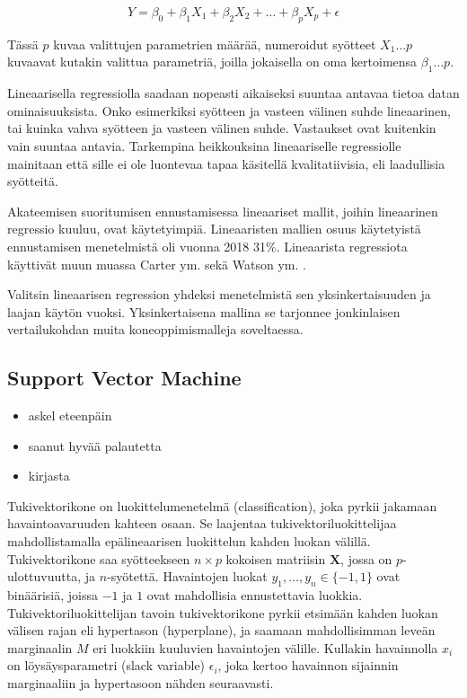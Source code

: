 \documentclass[finnish,twoside,openright]{HYgraduMLDS}
\begin{document}
\begin{equation} \label{eq:2}
    Y = \beta_0 + \beta_1 X_1 + \beta_2 X_2 + \dots + \beta_p X_p + \epsilon
\end{equation}

Tässä $p$ kuvaa valittujen parametrien määrää, numeroidut syötteet $X_1\dots p$ kuvaavat kutakin valittua parametriä, joilla jokaisella on oma kertoimensa $\beta_1\dots p$.

Lineaarisella regressiolla saadaan nopeasti aikaiseksi suuntaa antavaa tietoa datan ominaisuuksista. Onko esimerkiksi syötteen ja vasteen välinen suhde lineaarinen, tai kuinka vahva syötteen ja vasteen välinen suhde. Vastaukset ovat kuitenkin vain suuntaa antavia. Tarkempina heikkouksina lineaariselle regressiolle mainitaan että sille ei ole luontevaa tapaa käsitellä kvalitatiivisia, eli laadullisia syötteitä\cite{james2013ISLR}. 

Akateemisen suoritumisen ennustamisessa lineaariset mallit, joihin lineaarinen regressio kuuluu, ovat käytetyimpiä. Lineaaristen mallien osuus käytetyistä ennustamisen menetelmistä oli vuonna 2018 31\%\cite{hellas2018predicting}. Lineaarista regressiota käyttivät muun muassa Carter ym. \cite{carter2015normalized} sekä Watson ym. \cite{watson2013predicting}.

Valitsin lineaarisen regression yhdeksi menetelmistä sen yksinkertaisuuden ja laajan käytön vuoksi. Yksinkertaisena mallina se tarjonnee jonkinlaisen vertailukohdan muita koneoppimismalleja soveltaessa.


\subsection{Support Vector Machine}

\begin{itemize}
    \item askel eteenpäin
    \item saanut hyvää palautetta
    \item kirjasta\cite{james2013ISLR}
\end{itemize}

Tukivektorikone on luokittelumenetelmä (classification), joka pyrkii jakamaan havaintoavaruuden kahteen osaan. Se laajentaa tukivektoriluokittelijaa mahdollistamalla epälineaarisen luokittelun kahden luokan välillä\cite{james2013ISLR}. Tukivektorikone saa syötteekseen $n \times p$ kokoisen matriisin $\textbf{X}$, jossa on $p$-ulottuvuutta, ja $n$-syötettä. Havaintojen luokat $y_1, \dots, y_n \in \{-1, 1\}$ ovat binäärisiä, joissa $-1$ ja $1$ ovat mahdollisia ennustettavia luokkia. Tukivektoriluokittelijan tavoin tukivektorikone pyrkii etsimään kahden luokan välisen rajan eli hypertason (hyperplane), ja saamaan mahdollisimman leveän marginaalin $M$ eri luokkiin kuuluvien havaintojen välille. Kullakin havainnolla $x_i$ on löysäysparametri (slack variable) $\epsilon_i$, joka kertoo havainnon sijainnin marginaaliin ja hypertasoon nähden seuraavasti. 
\end{document}
